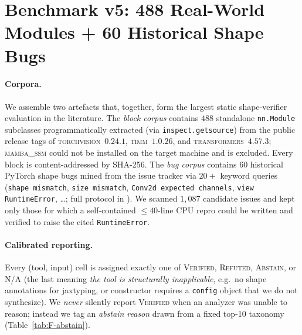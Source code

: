 \section{Benchmark v5: 488 Real-World Modules + 60 Historical Shape Bugs}
\label{sec:F_benchmark}

\paragraph{Corpora.}
We assemble two artefacts that, together, form the largest static
shape-verifier evaluation in the literature. The \emph{block corpus}
contains $488$ standalone \texttt{nn.Module} subclasses programmatically
extracted (via \texttt{inspect.getsource}) from the public release tags of
\textsc{torchvision}~$0.24.1$, \textsc{timm}~$1.0.26$, and
\textsc{transformers}~$4.57.3$; \textsc{mamba\_ssm} could not be installed
on the target machine and is excluded. Every block is
content-addressed by SHA-256. The \emph{bug corpus} contains $60$
historical PyTorch shape bugs mined from the
 issue tracker via $20{+}$ keyword queries
(\texttt{shape mismatch}, \texttt{size mismatch}, \texttt{Conv2d expected channels},
\texttt{view RuntimeError}, \dots; full protocol in
). We scanned $1{,}087$
candidate issues and kept only those for which a self-contained
$\le 40$-line CPU repro could be written and verified to raise the cited
\texttt{RuntimeError}.

\paragraph{Calibrated reporting.}
Every (tool, input) cell is assigned exactly one of
\textsc{Verified}, \textsc{Refuted}, \textsc{Abstain}, or
\textsc{N/A} (the last meaning \emph{the tool is structurally
inapplicable}, e.g.\ no shape annotations for jaxtyping, or constructor
requires a \texttt{config} object that we do not synthesize). We
\emph{never} silently report \textsc{Verified} when an analyzer was
unable to reason; instead we tag an \emph{abstain reason} drawn from a
fixed top-10 taxonomy (Table~\ref{tab:F-abstain}).

